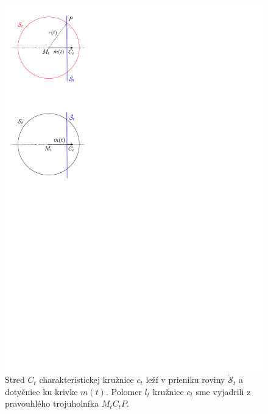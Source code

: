 \begin{figure}[h]
	\centering
	\includegraphics[trim={-4cm 23cm 0 0cm},clip]{images/trojuholnik.pdf}
	\caption[Stred a polomer charakteristickej kružnice.]{Stred $C_t$ charakteristickej kružnice $c_t$ leží v prieniku roviny $\mathcal{\dot{S}}_t$ a dotyčnice ku krivke $m(t)$. Polomer $l_t$ kružnice $c_t$ sme  vyjadrili z pravouhlého trojuholníka $M_tC_tP$. }
	\label{fig:trojuholnik}
\end{figure}

